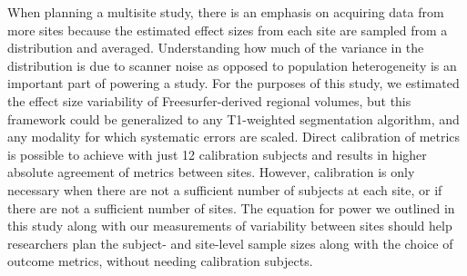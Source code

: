When planning a multisite study, there is an emphasis on acquiring data from more sites because the estimated effect sizes from each site are sampled from a distribution and averaged. Understanding how much of the variance in the distribution is due to scanner noise as opposed to population heterogeneity is an important part of powering a study. For the purposes of this study, we estimated the effect size variability of Freesurfer-derived regional volumes, but this framework could be generalized to any T1-weighted segmentation algorithm, and any modality for which systematic errors are scaled. Direct calibration of metrics is possible to achieve with just 12 calibration subjects and results in higher absolute agreement of metrics between sites. However, calibration is only necessary when there are not a sufficient number of subjects at each site, or if there are not a sufficient number of sites. The equation for power we outlined in this study along with our measurements of variability between sites should help researchers plan the subject- and site-level sample sizes along with the choice of outcome metrics, without needing calibration subjects. %